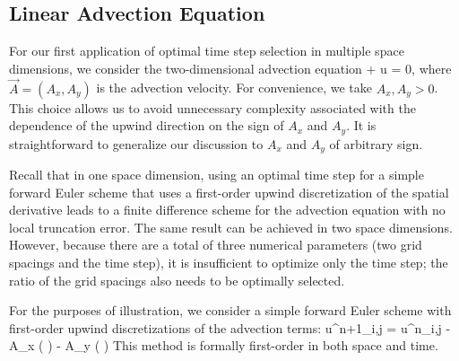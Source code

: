 \documentclass[oneeqnum,onefignum,onetabnum,onethmnum]{siamltex}
\begin{document}
\subsection{Linear Advection Equation}
For our first application of optimal time step selection in multiple
space dimensions, we consider the two-dimensional advection
equation
\beq
   +  \cdot \nabla u = 0,
  \label{eq:advection_eqn_2d}
\eeq
where $\vec{A} = (A_x, A_y)$ is the advection velocity.  For convenience, we 
take $A_x, A_y > 0$.  This choice allows us to avoid unnecessary complexity 
associated with the dependence of the upwind direction on the sign of $A_x$ 
and $A_y$.  It is straightforward to generalize our discussion to $A_x$ and 
$A_y$ of arbitrary sign.

Recall that in one space dimension, using an optimal time step for
a simple forward Euler scheme that uses a first-order upwind discretization
of the spatial derivative leads to a finite difference scheme for the 
advection equation with no local truncation error.  The same result can be 
achieved in two space dimensions.  However, because there are a total of three
numerical parameters (\ie two grid spacings and the time step), it is 
insufficient to optimize only the time step; the ratio of the grid 
spacings also needs to be optimally selected. 

For the purposes of illustration, we consider a simple forward Euler scheme 
with first-order upwind discretizations of the advection terms:
\beq
  u^{n+1}_{i,j} = u^{n}_{i,j}
  - A_x \dt \left(  \right)
  - A_y \dt \left(  \right)
  \label{eq:advection_eqn_2d_FD_scheme}
\eeq
This method is formally first-order in both space and time.  
\end{document}
